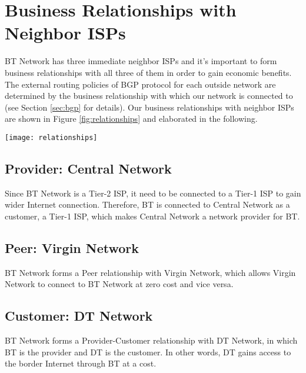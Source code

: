 \section{Business Relationships with Neighbor ISPs}
\label{sec:relationships}

BT Network has three immediate neighbor ISPs and it's important to form business relationships with all three of them in order to gain economic benefits. 
The external routing policies of BGP protocol for each outside network are determined by the business relationship with which our network is connected to (see Section \ref{sec:bgp} for details).
Our business relationships with neighbor ISPs are shown in Figure \ref{fig:relationships} and elaborated in the following.

\begin{figure*}[ht!]
    \centering
    \texttt{[image: relationships]}
    \caption{Business Relationships of BT Network with Neighbor ISPs.}
    \label{fig:relationships}
\end{figure*}


\subsection{Provider: Central Network}
Since BT Network is a Tier-2 ISP, it need to be connected to a Tier-1 ISP to gain wider Internet connection. Therefore, BT is connected to Central Network as a customer, a Tier-1 ISP, which makes Central Network a network provider for BT.

\subsection{Peer: Virgin Network}
BT Network forms a Peer relationship with Virgin Network, which allows Virgin Network to connect to BT Network at zero cost and vice versa.

\subsection{Customer: DT Network}
\label{sec:dt}
BT Network forms a Provider-Customer relationship with DT Network, in which BT is the provider and DT is the customer. In other words, DT gains access to the border Internet through BT at a cost.
